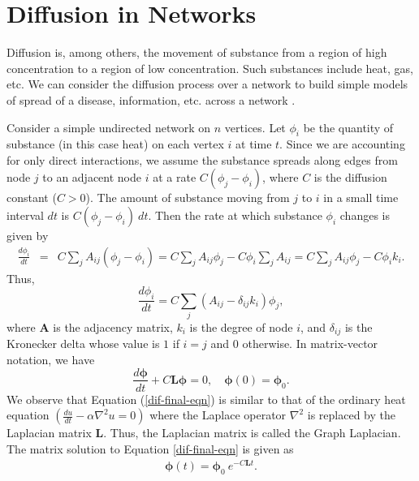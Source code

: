 \documentclass[10pt,a4paper]{article}
\begin{document}
%

\section*{Diffusion in Networks}
Diffusion is, among others, the movement of substance from a region of high concentration to a region of low concentration. Such substances include heat, gas, etc. We can consider the diffusion process over a network to build simple models of spread of a disease, information, etc. across a network \cite{newman2010networks}.

Consider a simple undirected network on $n$ vertices. Let $\phi_i$ be the quantity of substance (in this case heat) on each vertex $i$ at time $t$. Since we are accounting for only direct interactions, we assume the substance spreads along edges from node $j$ to an adjacent node $i$ at a rate $C(\phi_j -\phi_i)$, where $C$ is the diffusion constant ($C>0$). The amount of substance moving from $j$ to $i$ in a small time interval $dt$ is $C(\phi_j -\phi_i)~dt$. Then the rate at which substance $\phi_i$ changes is given by
\begin{eqnarray*}
	\frac{d\phi_i}{dt} &=& C \sum_j A_{ij}(\phi_j - \phi_i) = C \sum_j A_{ij} \phi_j - C \phi_i \sum_j A_{ij} = C \sum_j A_{ij} \phi_j - C\phi_i k_i .
\end{eqnarray*}
Thus,
\begin{equation}
\frac{d\phi_i}{dt} = C \sum_j (A_{ij} - \delta_{ij} k_i) \phi_j,
\label{difusion}
\end{equation}
where $\mathbf{A}$ is the adjacency matrix, $k_i$ is the degree of node $i$, and $\delta_{ij}$ is the Kronecker delta whose value is $1$ if $i=j$ and $0$ otherwise.
In matrix-vector notation, we have
\begin{equation}
\frac{d\boldsymbol{\phi}}{dt} + C\mathbf{L}\boldsymbol{\phi} = 0, \quad \boldsymbol{\phi}(0) = \boldsymbol{\phi}_0 .
\label{dif-final-eqn}
\end{equation}
We observe that Equation (\ref{dif-final-eqn}) is similar to that of the ordinary heat equation $\left(\frac{du}{dt} - \alpha \nabla^2 u = 0 \right)$ where the Laplace operator $\nabla^2$ is replaced by the Laplacian matrix $\mathbf{L}$. Thus, the Laplacian matrix is called the Graph Laplacian. The matrix solution to Equation \eqref{dif-final-eqn} is given as
\begin{eqnarray}
\boldsymbol{\phi}(t) = \boldsymbol{\phi}_0~e^{-C\mathbf{L}t}.
\end{eqnarray}
\end{document}
